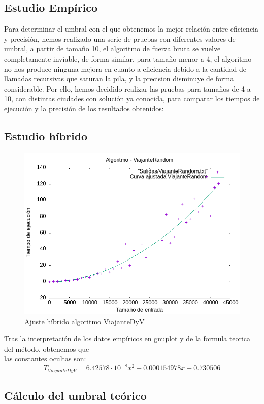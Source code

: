 \documentclass[11pt,openany]{book}
\begin{document}
\subsection{Estudio Empírico}
Para determinar el umbral con el que obtenemos la mejor relación entre eficiencia y precisión, hemos
realizado una serie de pruebas con diferentes valores de umbral, a partir de tamaño 10, el algoritmo de
fuerza bruta se vuelve completamente inviable, de forma similar, para tamaño menor a 4, el algoritmo
no nos produce ninguna mejora en cuanto a eficiencia debido a la cantidad de llamadas recursivas que
saturan la pila, y la precision disminuye de forma considerable. Por ello, hemos decidido realizar
las pruebas para tamaños de 4 a 10, con distintas ciudades con solución ya conocida, para comparar
los tiempos de ejecución y la precisión de los resultados obtenidos:
\subsection{Estudio híbrido}
\begin{center}
      \begin{figure}[H]
            \centering
            \includegraphics[width=0.7\linewidth]{assets/Img/ViajanteRandom_hib.png}
            \caption{Ajuste híbrido algoritmo ViajanteDyV}
            \label{fig:ViajanteDyV}
      \end{figure}
\end{center}
Tras la interpretación de los datos empíricos en gnuplot y de la formula teorica del método, obtenemos que \\
las constantes ocultas son:
\begin{equation*}
      T_{ViajanteDyV}=6.42578 \cdot 10^{-8} x^2 +0.000154978 x-0.730506 
\end{equation*}
\subsection{Cálculo del umbral teórico}
\end{document}
